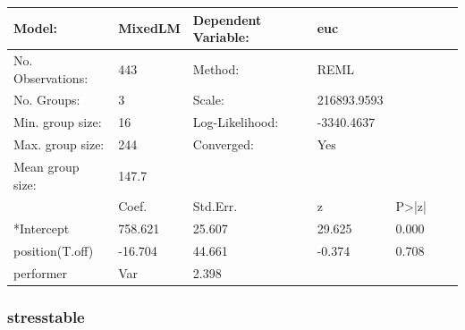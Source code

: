 \documentclass[12pt]{article}
\begin{document}
\begin{table}[htbp]
  \centering
  \begin{tabular}{@{} lllllcc @{}}
    \toprule


Model:	&MixedLM	&Dependent Variable:&	euc \\
\midrule
No. Observations:	& 443	&Method: &	REML \\
No. Groups:&	3	&  Scale: &	216893.9593 \\
Min. group size:	& 16&	Log-Likelihood:	& -3340.4637 \\
Max. group size:	& 244	& Converged:	& Yes \\
Mean group size:	& 147.7		& \\
\midrule
& Coef. &	Std.Err.	&z&	P>|z|	 \\

*Intercept	& 758.621 & 	25.607	& 29.625	& 0.000	 \\
position(T.off) &	-16.704 &	44.661	& -0.374 &	0.708 \\
performer & Var	& 2.398	& & \\
    \bottomrule
  \end{tabular}
 \label{tab:label}
\end{table}
\pagebreak
\subsubsection{stresstable}
\end{document}
